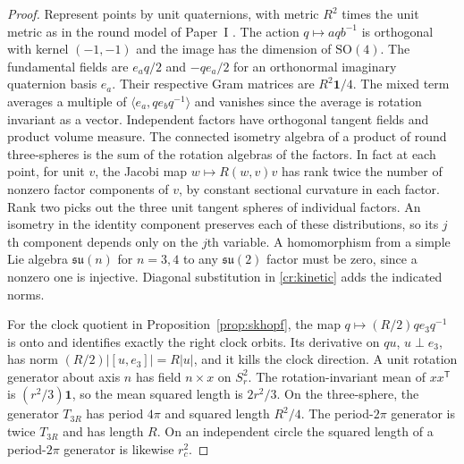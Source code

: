 \documentclass[aps,pra,onecolumn,superscriptaddress,nofootinbib,10pt]{revtex4-2}
\theoremstyle{definition}
\theoremstyle{remark}
\newcommand{\SO}{\mathrm{SO}}
\begin{document}
\begin{proof}
Represent points by unit quaternions, with metric $R^2$ times the unit
metric as in the round model of Paper~I \cite[Thm.~5.18, Cor.~5.19]{PaperI}.
The action $q\mapsto aqb^{-1}$ is orthogonal with kernel
$(-1,-1)$ and the image has the dimension of $\SO(4)$.
The fundamental fields are $e_aq/2$ and $-qe_a/2$ for an orthonormal
imaginary quaternion basis $e_a$. Their respective Gram matrices are
$R^2\mathbf 1/4$. The mixed term averages a multiple of
$\langle e_a,q e_b q^{-1}\rangle$ and vanishes since the average is
rotation invariant as a vector. Independent factors have orthogonal
tangent fields and product volume measure. The connected isometry
algebra of a product of round three-spheres is the sum of the rotation
algebras of the factors. In fact at each point, for unit $v$,
the Jacobi map $w\mapsto R(w,v)v$ has rank twice the number of
nonzero factor components of $v$, by constant sectional curvature in
each factor. Rank two picks out the three unit tangent spheres of
individual factors. An isometry in the identity component preserves
each of these distributions, so its $j$th component depends only on
the $j$th variable. A homomorphism from a simple Lie algebra
$\mathfrak{su}(n)$ for $n=3,4$ to any $\mathfrak{su}(2)$ factor
must be zero, since a nonzero one is injective. Diagonal substitution
in \eqref{cr:kinetic} adds the indicated norms.

For the clock quotient in Proposition~\ref{prop:skhopf}, the map
$q\mapsto(R/2)q e_3q^{-1}$ is onto and identifies exactly the right
clock orbits. Its derivative on $qu$, $u\perp e_3$, has norm
$(R/2)\lvert[u,e_3]\rvert=R\lvert u\rvert$, and it kills the clock
direction. A unit rotation generator about axis $n$ has field
$n\times x$ on $S^2_r$. The rotation-invariant mean of $xx^{\mathsf T}$
is $(r^2/3)\mathbf 1$, so the mean squared length is $2r^2/3$.
On the three-sphere, the generator $T_{3R}$ has period $4\pi$
and squared length $R^2/4$. The period-$2\pi$ generator is twice
$T_{3R}$ and has length $R$. On an independent circle the squared
length of a period-$2\pi$ generator is likewise $r_c^2$.
\end{proof}
\end{document}
